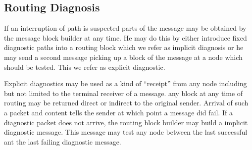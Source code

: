 \documentclass[9pt,journal,compsoc]{IEEEtran}
\begin{document}
\subsection{Routing Diagnosis}
If an interruption of path is suspected parts of the message may be obtained by the message block builder at any time. He may do this by either introduce fixed diagnostic paths into a routing block which we refer as implicit diagnosis or he may send a second message picking up a block of the message at a node which should be tested. This we refer as explicit diagnostic.

Explicit diagnostics may be used as a kind of ``receipt'' from any node including but not limited to the terminal receiver of a message. any block at any time of routing may be returned direct or indirect to the original sender. Arrival of such a packet and content tells the sender at which point a message did fail. If a diagnostic packet does not arrive, the routing block builder may build a implicit diagnostic message. This message may test any node between the last successful ant the last failing diagnostic message.

%
%

\end{document}
